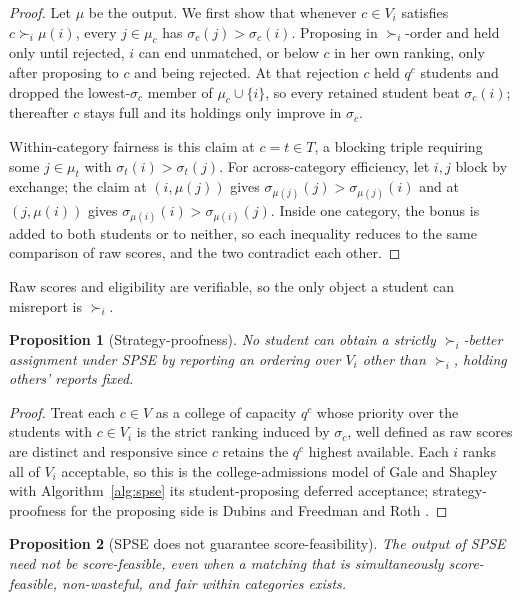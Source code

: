 \documentclass[a4paper,twoside]{article}
\newtheorem{proposition}{Proposition}
\theoremstyle{definition}
\begin{document}
\begin{proof}
Let $\mu$ be the output. We first show that whenever $c\in V_i$ satisfies $c\succ_i\mu(i)$, every $j\in\mu_c$ has $\sigma_c(j)>\sigma_c(i)$. Proposing in $\succ_i$-order and held only until rejected, $i$ can end unmatched, or below $c$ in her own ranking, only after proposing to $c$ and being rejected. At that rejection $c$ held $q^c$ students and dropped the lowest-$\sigma_c$ member of $\mu_c\cup\{i\}$, so every retained student beat $\sigma_c(i)$; thereafter $c$ stays full and its holdings only improve in $\sigma_c$.

Within-category fairness is this claim at $c=t\in T$, a blocking triple requiring some $j\in\mu_t$ with $\sigma_t(i)>\sigma_t(j)$. For across-category efficiency, let $i,j$ block by exchange; the claim at $(i,\mu(j))$ gives $\sigma_{\mu(j)}(j)>\sigma_{\mu(j)}(i)$ and at $(j,\mu(i))$ gives $\sigma_{\mu(i)}(i)>\sigma_{\mu(i)}(j)$. Inside one category, the bonus is added to both students or to neither, so each inequality reduces to the same comparison of raw scores, and the two contradict each other.
\end{proof}

Raw scores and eligibility are verifiable, so the only object a student can misreport is $\succ_i$.

\begin{proposition}[Strategy-proofness]
\label{prop:spse-sp}
No student can obtain a strictly $\succ_i$-better assignment under SPSE by reporting an ordering over $V_i$ other than $\succ_i$, holding others' reports fixed.
\end{proposition}

\begin{proof}
Treat each $c\in V$ as a college of capacity $q^c$ whose priority over the students with $c\in V_i$ is the strict ranking induced by $\sigma_c$, well defined as raw scores are distinct and responsive since $c$ retains the $q^c$ highest available. Each $i$ ranks all of $V_i$ acceptable, so this is the college-admissions model of Gale and Shapley \cite{GaSh62a} with Algorithm~\ref{alg:spse} its student-proposing deferred acceptance; strategy-proofness for the proposing side is Dubins and Freedman \cite{DuFr81a} and Roth \cite{Roth82a}.
\end{proof}

\begin{proposition}[SPSE does not guarantee score-feasibility]
\label{prop:spse-not-sf}
The output of SPSE need not be score-feasible, even when a matching that is simultaneously score-feasible, non-wasteful, and fair within categories exists.
\end{proposition}
\end{document}

